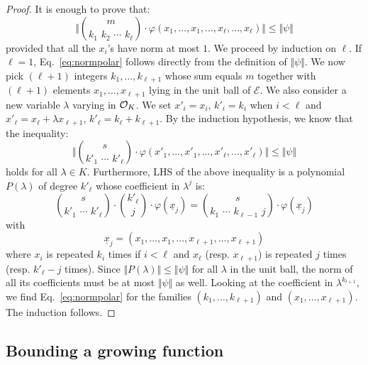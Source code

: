 \documentclass{sig-alternate}
\begin{document}
\begin{proof}
It is enough to prove that:
\begin{equation}
\label{eq:normpolar}
\Big\Vert \binom m {k_1 \,\, k_2 \,\, \cdots \,\, k_\ell} \cdot
\varphi(x_1, \ldots, x_1, \ldots, x_\ell, \ldots,
x_\ell) \Big\Vert \leq \Vert \psi \Vert
\end{equation}
provided that all the $x_i$'s have norm at most $1$. We proceed by 
induction on 
$\ell$. If $\ell = 1$, Eq.~\eqref{eq:normpolar} follows directly from
the definition of $\Vert \psi \Vert$. 
We now pick $(\ell+1)$ integers $k_1, \ldots, k_{\ell+1}$ whose sum 
equals $m$ together with $(\ell+1)$ elements $x_1, \ldots, x_{\ell+1}$
lying in the unit ball of $\mathcal E$.
We also consider a new variable $\lambda$ varying in
$\mathcal O_K$. We set $x'_i = x_i$, $k'_i = k_i$ when $i < \ell$ and $x'_\ell 
= x_\ell + \lambda x_{\ell+1}$, $k'_\ell = k_\ell + k_{\ell+1}$. By the 
induction hypothesis, we know that the inequality:
$$\Big\Vert \binom s {k'_1 \,\, \cdots \,\, k'_\ell} \cdot
\varphi(x'_1, \ldots, x'_1, \ldots, x'_\ell, \ldots, x'_\ell) \Big\Vert
\leq \Vert \psi \Vert$$
holds for all $\lambda \in K$. Furthermore, LHS of the above inequality
is a polynomial $P(\lambda)$ of degree $k'_\ell$ whose coefficient in 
$\lambda^j$ is:
$$\binom s {k'_1 \,\, \cdots \,\, k'_\ell} \cdot
\binom {k'_\ell} {j} \cdot
\varphi(\underline x_j) = 
\binom s {k_1 \,\, \cdots \,\, k_{\ell-1} \,\, j} \cdot
\varphi(\underline x_j)$$
with
$$\underline x_j = (x_1, \ldots, x_1, \ldots, x_{\ell+1}, \ldots, 
x_{\ell+1})$$
where $x_i$ is repeated $k_i$ times if $i < \ell$ and $x_\ell$ 
(resp. $x_{\ell+1}$) is repeated $j$ times (resp. $k'_\ell - j$ times).
Since $\Vert P(\lambda) \Vert \leq \Vert \psi \Vert$ for all $\lambda$ in 
the unit ball, the norm of all its coefficients must be at most $\Vert \psi
\Vert$ as well. Looking at the coefficient in $\lambda^{k_{l+1}}$, we find
Eq.~\eqref{eq:normpolar} for the families $(k_1, \ldots, k_{\ell+1})$ 
and $(x_1, \ldots, x_{\ell+1})$. The induction follows.
\end{proof}

\subsection{Bounding a growing function}
\label{ssec:boundLambdaf}
\end{document}
